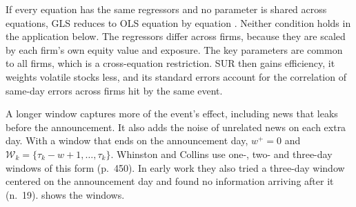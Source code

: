 \begin{remark}\label{rem:09-wc-sur}
If every equation has the same regressors and no parameter is shared across equations, GLS reduces to
OLS equation by equation \citep{Zellner1962}. Neither condition holds in the application below. The
regressors differ across firms, because they are scaled by each firm's own equity value and exposure.
The key parameters are common to all firms, which is a cross-equation restriction. SUR then gains
efficiency, it weights volatile stocks less, and its standard errors account for the correlation of
same-day errors across firms hit by the same event.
\end{remark}

A longer window captures more of the event's effect, including news that leaks before the
announcement. It also adds the noise of unrelated news on each extra day. With a window that ends on
the announcement day, $w^+=0$ and $\mathcal{W}_k=\{\tau_k-w+1,\dots,\tau_k\}$. Whinston and Collins
use one-, two- and three-day windows of this form (p.~450). In early work they also tried a
three-day window centered on the announcement day and found no information arriving after it
(n.~19).  shows the windows.

